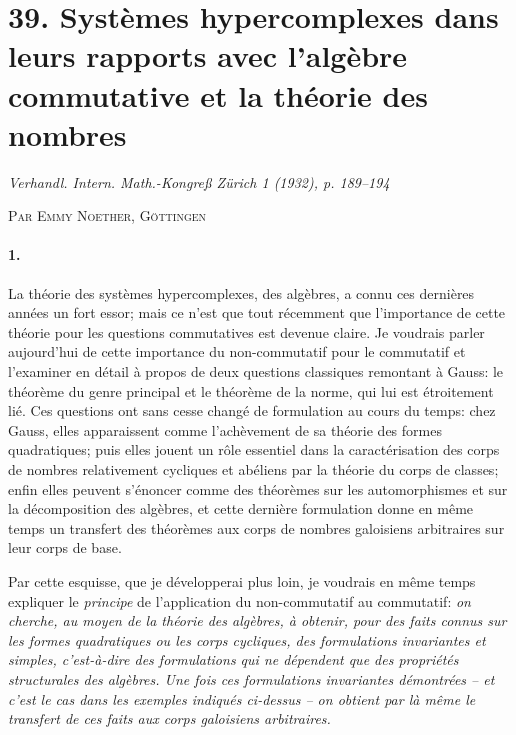 \section*{39. Systèmes hypercomplexes dans leurs rapports avec l'algèbre commutative et la théorie des nombres}

\begin{center}
\emph{Verhandl. Intern. Math.-Kongreß Zürich 1 (1932), p. 189--194}
\end{center}

\begin{center}
\textsc{Par Emmy Noether, Göttingen}
\end{center}

\paragraph{1.}
La théorie des systèmes hypercomplexes, des algèbres, a connu ces dernières années un fort essor; mais ce n'est que tout récemment que l'importance de cette théorie pour les questions commutatives est devenue claire. Je voudrais parler aujourd'hui de cette importance du non-commutatif pour le commutatif et l'examiner en détail à propos de deux questions classiques remontant à Gauss: le théorème du genre principal et le théorème de la norme, qui lui est étroitement lié. Ces questions ont sans cesse changé de formulation au cours du temps: chez Gauss, elles apparaissent comme l'achèvement de sa théorie des formes quadratiques; puis elles jouent un rôle essentiel dans la caractérisation des corps de nombres relativement cycliques et abéliens par la théorie du corps de classes; enfin elles peuvent s'énoncer comme des théorèmes sur les automorphismes et sur la décomposition des algèbres, et cette dernière formulation donne en même temps un transfert des théorèmes aux corps de nombres galoisiens arbitraires sur leur corps de base.

Par cette esquisse, que je développerai plus loin, je voudrais en même temps expliquer le \emph{principe} de l'application du non-commutatif au commutatif: \emph{on cherche, au moyen de la théorie des algèbres, à obtenir, pour des faits connus sur les formes quadratiques ou les corps cycliques, des formulations invariantes et simples, c'est-à-dire des formulations qui ne dépendent que des propriétés structurales des algèbres. Une fois ces formulations invariantes démontrées -- et c'est le cas dans les exemples indiqués ci-dessus -- on obtient par là même le transfert de ces faits aux corps galoisiens arbitraires.}

